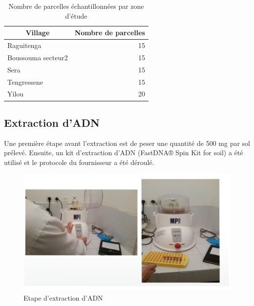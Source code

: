 \documentclass[a4paper,11pt]{article}
\begin{document}
\begin{table}
  \begin{center}
    \begin{tabular}{|l|r|}
      \hline \multicolumn{1}{|c|}{Village}&\multicolumn{1}{c|}{Nombre
        de parcelles} \\ \hline Raguitenga & 15\\Boussouma secteur2 &
      15\\ Sera & 15 \\ Tengressene & 15\\ Yilou & 20\\ \hline
    \end{tabular}
    \caption{Nombre de parcelles échantillonnées par zone d'étude}
    \label{tableau:Nombre de parcelles échantillonnées par zone d'étude}
  \end{center}
\end{table}


\subsection{Extraction d'ADN}

Une première étape avant l'extraction est de peser une quantité de 500
mg par sol prélevé. Ensuite, un kit d'extraction d'ADN (FastDNA® Spin
Kit for soil) a été utilisé et le protocole du fournisseur a été
déroulé.

\begin{figure}
  \begin{center}
    \includegraphics[width=16cm]{images/image2}
  \end{center}
  \caption{Etape d'extraction d'ADN}
  \label{fig-image2}
\end{figure}
\end{document}
